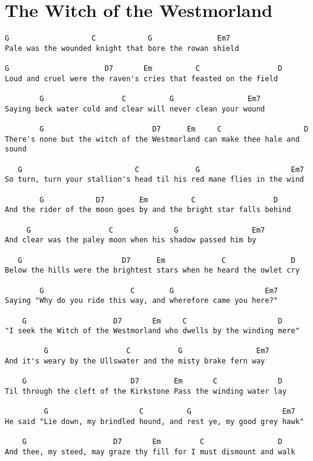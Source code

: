 \documentclass[leqno]{memoir}
\begin{document}
\chapter{The Witch of the Westmorland}
\begin{verbatim}
G                   C            G               Em7
Pale was the wounded knight that bore the rowan shield

G                      D7       Em          C                  D
Loud and cruel were the raven's cries that feasted on the field

        G                  C          G                 Em7
Saying beck water cold and clear will never clean your wound

        G                         D7      Em     C                   D
There's none but the witch of the Westmorland can make thee hale and sound

   G                          C             G                     Em7
So turn, turn your stallion's head til his red mane flies in the wind

        G            D7        Em          C                  D
And the rider of the moon goes by and the bright star falls behind

     G                  C              G                 Em7
And clear was the paley moon when his shadow passed him by

   G                       D7      Em             C               D
Below the hills were the brightest stars when he heard the owlet cry

        G                    C        G                     Em7
Saying "Why do you ride this way, and wherefore came you here?"

    G                    D7       Em     C                     D
"I seek the Witch of the Westmorland who dwells by the winding mere"

         G                  C           G                 Em7
And it's weary by the Ullswater and the misty brake fern way

    G                        D7        Em       C              D
Til through the cleft of the Kirkstone Pass the winding water lay

         G                     C          G                     Em7
He said "Lie down, my brindled hound, and rest ye, my good grey hawk"

    G                    D7       Em         C                 D
And thee, my steed, may graze thy fill for I must dismount and walk


\end{verbatim}
\end{document}
